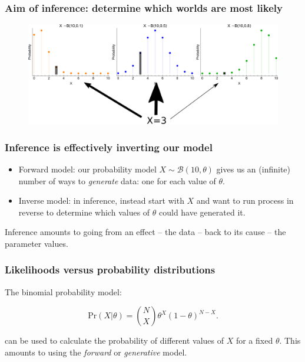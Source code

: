 \documentclass[handout]{beamer}
\begin{document}
\begin{frame}
	\frametitle{Aim of inference: determine which worlds are most likely}
	\begin{figure}[h]
		\centerline{\includegraphics[width=1\textwidth]{animations_figures/binomial_many_worlds_inverse.pdf}}
	\end{figure}
\end{frame}

\begin{frame}
	\frametitle{Inference is effectively inverting our model}
	
	\begin{itemize}
		\item Forward model: our probability model $X\sim \mathcal{B}(10,\theta)$ gives us an (infinite) number of ways to \textit{generate} data: one for each value of $\theta$.
		\item Inverse model: in inference, instead start with $X$ and want to run process in reverse to determine which values of $\theta$ could have generated it.
	\end{itemize}
	
	Inference amounts to going from an effect -- the data -- back to its cause -- the parameter values.
	
\end{frame}

\begin{frame}
	\frametitle{Likelihoods versus probability distributions}
	
	The binomial probability model:
	
	\begin{equation}
	\text{Pr}(X|\theta) = \binom{N}{X} \theta^X (1- \theta)^{N-X}.
	\end{equation}
	
	can be used to calculate the probability of different values of $X$ for a fixed $\theta$. This amounts to using the \textit{forward} or \textit{generative} model.
	
\end{frame}
\end{document}
